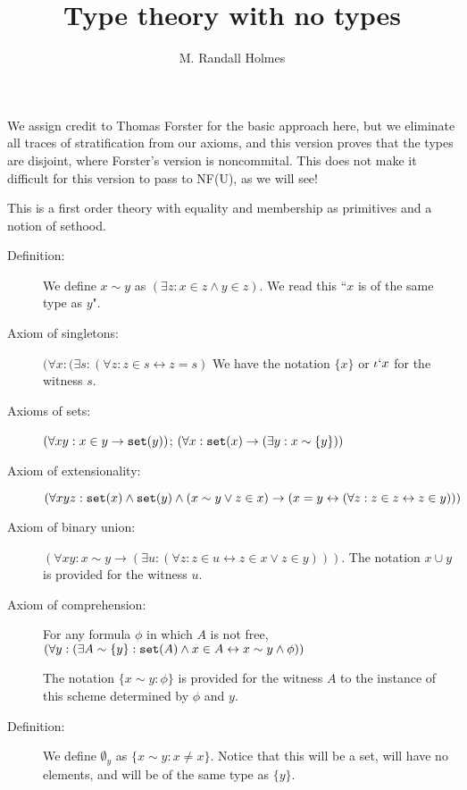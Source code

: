 \documentclass[12pt]{article}
\title{Type theory with no types}
\author{M. Randall Holmes}
\begin{document}
\maketitle

We assign credit to Thomas Forster for the basic approach here, but we eliminate all traces of stratification from our axioms, and this version proves that the types are disjoint, where Forster's version is noncommital.  This does not make it difficult for this version to pass to NF(U), as we will see!

This is a first order theory with equality and membership as primitives and a notion of sethood.

\begin{description}




\item[Definition:]  We define $x \sim y$ as $(\exists z:x \in z \wedge y \in z)$.  We read this ``$x$ is of the same type as $y$".

\item[Axiom of singletons:]  $(\forall x:(\exists s:(\forall z:z \in s \leftrightarrow z = s)$  We have the notation $\{x\}$ or $\iota`x$ for the witness $s$.

\item[Axioms of sets:]  $(\forall xy:  x \in y \rightarrow {\tt set}(y))$;  $(\forall x:{\tt set}(x) \rightarrow (\exists y:x \sim \{y\}))$

\item[Axiom of extensionality:]  $(\forall xyz:{\tt set}(x) \wedge {\tt set}(y) \wedge (x \sim y \vee z \in x) \rightarrow (x = y \leftrightarrow (\forall z:z \in z \leftrightarrow z \in y)))$

\item[Axiom of binary union:]  $(\forall xy:x \sim y \rightarrow (\exists u:(\forall z:z \in u \leftrightarrow z \in x \vee z \in y)))$.  The notation $x \cup y$ is provided for the witness $u$.

\item[Axiom of comprehension:]  For any formula $\phi$ in which $A$ is not free, $(\forall y:(\exists A \sim \{y\}:{\tt set}(A) \wedge x \in A \leftrightarrow x \sim y \wedge \phi))$

The notation $\{x \sim y:\phi\}$ is provided for the witness $A$ to the instance of this scheme determined by $\phi$ and $y$.

\item[Definition:]  We define $\emptyset_y$ as $\{x \sim y:x \neq x\}$.  Notice that this will be a set, will have no elements, and will be of the same type as $\{y\}$.


\end{description}
\end{document}
